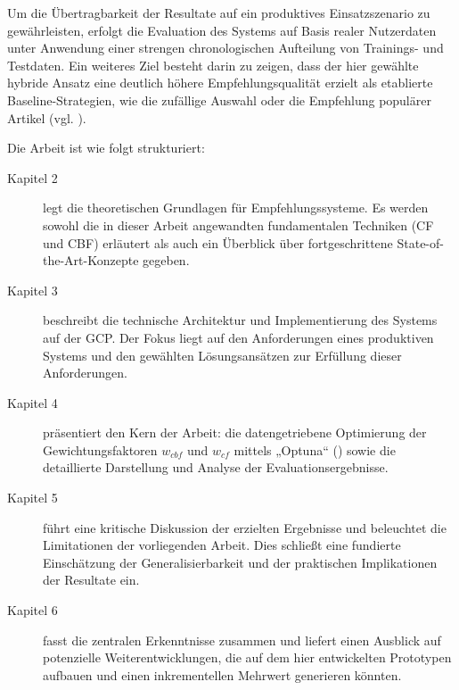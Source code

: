 Um die Übertragbarkeit der Resultate auf ein produktives Einsatzszenario zu gewährleisten, 
erfolgt die Evaluation des Systems auf Basis realer Nutzerdaten unter Anwendung einer strengen %
chronologischen Aufteilung von Trainings- und Testdaten. Ein weiteres Ziel besteht darin zu zeigen, dass der hier gewählte 
hybride Ansatz eine deutlich höhere Empfehlungsqualität 
erzielt als etablierte Baseline-Strategien, wie die zufällige 
Auswahl oder die Empfehlung populärer Artikel (vgl. \cite{wu_personalized_2022}).

Die Arbeit ist wie folgt strukturiert:
\begin{description}
    \item[Kapitel 2] legt die theoretischen Grundlagen für Empfehlungssysteme. Es werden sowohl die in dieser Arbeit angewandten fundamentalen Techniken (CF und CBF) erläutert als auch ein Überblick über fortgeschrittene State-of-the-Art-Konzepte gegeben.
    \item[Kapitel 3] beschreibt die technische Architektur und Implementierung des Systems auf der \ac{GCP}. Der Fokus liegt auf den Anforderungen eines produktiven Systems und den gewählten Lösungsansätzen zur Erfüllung dieser Anforderungen.
    \item[Kapitel 4] präsentiert den Kern der Arbeit: die datengetriebene Optimierung der Gewichtungsfaktoren \(w_{cbf}\) und \(w_{cf}\) mittels „Optuna“ (\cite{Akiba_Optuna_2019}) sowie die detaillierte Darstellung und Analyse der Evaluationsergebnisse.
    \item[Kapitel 5] führt eine kritische Diskussion der erzielten Ergebnisse und beleuchtet die Limitationen der vorliegenden Arbeit. Dies schließt eine fundierte Einschätzung der Generalisierbarkeit und der praktischen Implikationen der Resultate ein.
    \item[Kapitel 6] fasst die zentralen Erkenntnisse zusammen und liefert einen Ausblick auf potenzielle Weiterentwicklungen, die auf dem hier entwickelten Prototypen aufbauen und einen inkrementellen Mehrwert generieren könnten.
\end{description}